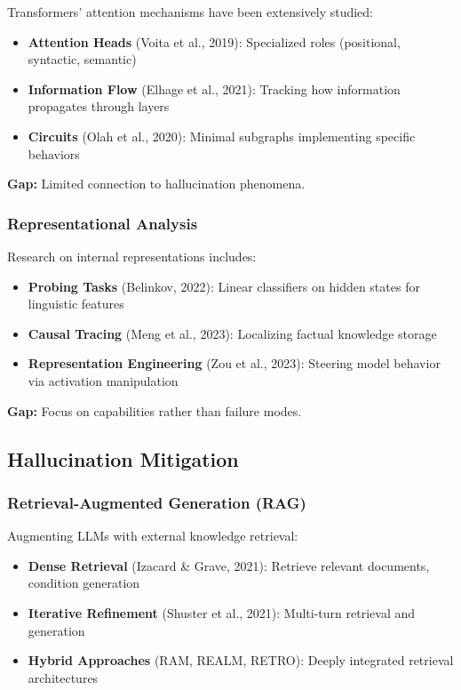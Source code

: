 \documentclass[11pt]{article}
\begin{document}
Transformers' attention mechanisms have been extensively studied:

\begin{itemize}
    \item \textbf{Attention Heads} (Voita et al., 2019): Specialized roles (positional, syntactic, semantic)
    \item \textbf{Information Flow} (Elhage et al., 2021): Tracking how information propagates through layers
    \item \textbf{Circuits} (Olah et al., 2020): Minimal subgraphs implementing specific behaviors
\end{itemize}

\textbf{Gap:} Limited connection to hallucination phenomena.

\subsubsection{Representational Analysis}

Research on internal representations includes:

\begin{itemize}
    \item \textbf{Probing Tasks} (Belinkov, 2022): Linear classifiers on hidden states for linguistic features
    \item \textbf{Causal Tracing} (Meng et al., 2023): Localizing factual knowledge storage
    \item \textbf{Representation Engineering} (Zou et al., 2023): Steering model behavior via activation manipulation
\end{itemize}

\textbf{Gap:} Focus on capabilities rather than failure modes.

\subsection{Hallucination Mitigation}

\subsubsection{Retrieval-Augmented Generation (RAG)}

Augmenting LLMs with external knowledge retrieval:

\begin{itemize}
    \item \textbf{Dense Retrieval} (Izacard \& Grave, 2021): Retrieve relevant documents, condition generation
    \item \textbf{Iterative Refinement} (Shuster et al., 2021): Multi-turn retrieval and generation
    \item \textbf{Hybrid Approaches} (RAM, REALM, RETRO): Deeply integrated retrieval architectures
\end{itemize}
\end{document}
